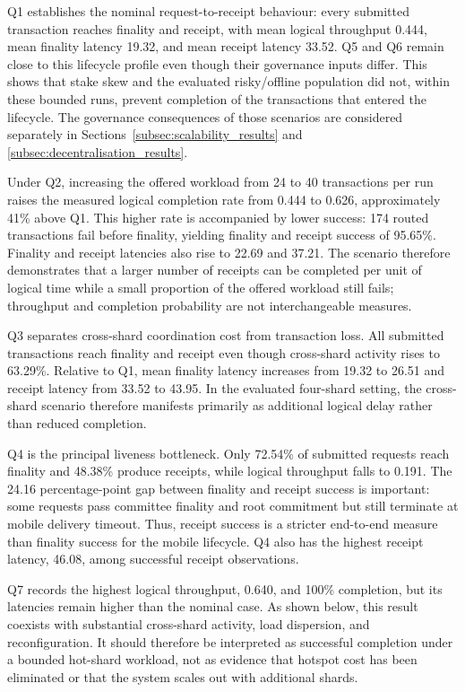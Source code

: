 \documentclass[a4paper,fleqn]{cas-sc}
\begin{document}
Q1 establishes the nominal request-to-receipt behaviour: every submitted
transaction reaches finality and receipt, with mean logical throughput 0.444,
mean finality latency 19.32, and mean receipt latency 33.52. Q5 and Q6 remain
close to this lifecycle profile even though their governance inputs differ.
This shows that stake skew and the evaluated risky/offline population did not,
within these bounded runs, prevent completion of the transactions that entered
the lifecycle. The governance consequences of those scenarios are considered
separately in Sections~\ref{subsec:scalability_results} and
\ref{subsec:decentralisation_results}.

Under Q2, increasing the offered workload from 24 to 40 transactions per run
raises the measured logical completion rate from 0.444 to 0.626, approximately
41\% above Q1. This higher rate is accompanied by lower success: 174 routed
transactions fail before finality, yielding finality and receipt success of
95.65\%. Finality and receipt latencies also rise to 22.69 and 37.21. The
scenario therefore demonstrates that a larger number of receipts can be
completed per unit of logical time while a small proportion of the offered
workload still fails; throughput and completion probability are not
interchangeable measures.

Q3 separates cross-shard coordination cost from transaction loss. All submitted
transactions reach finality and receipt even though cross-shard activity rises
to 63.29\%. Relative to Q1, mean finality latency increases from 19.32 to 26.51
and receipt latency from 33.52 to 43.95. In the evaluated four-shard setting,
the cross-shard scenario therefore manifests primarily as additional logical
delay rather than reduced completion.

Q4 is the principal liveness bottleneck. Only 72.54\% of submitted requests
reach finality and 48.38\% produce receipts, while logical throughput falls to
0.191. The 24.16 percentage-point gap between finality and receipt success is
important: some requests pass committee finality and root commitment but still
terminate at mobile delivery timeout. Thus, receipt success is a stricter
end-to-end measure than finality success for the mobile lifecycle. Q4 also has
the highest receipt latency, 46.08, among successful receipt observations.

Q7 records the highest logical throughput, 0.640, and 100\% completion, but its
latencies remain higher than the nominal case. As shown below, this result
coexists with substantial cross-shard activity, load dispersion, and
reconfiguration. It should therefore be interpreted as successful completion
under a bounded hot-shard workload, not as evidence that hotspot cost has been
eliminated or that the system scales out with additional shards.
\end{document}
